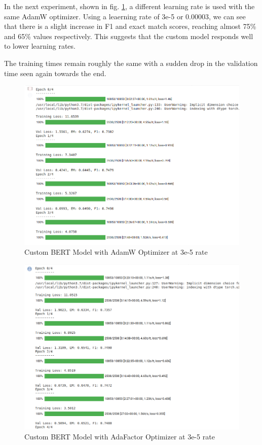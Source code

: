 \documentclass[a4paper,12pt]{report}
\begin{document}
	In the next experiment, shown in fig. \ref{adam3e}, a different learning rate is used with the same AdamW optimizer. Using a leaerning rate of 3e-5 or 0.00003, we can see that there is a slight increase in F1 and exact match scores, reaching almost 75\% and 65\% values respectively. This suggests that the custom model responds well to lower learning rates.
	
	The training times remain roughly the same with a sudden drop in the validation time seen again towards the end. 
	
		\begin{figure}[!h]
			\centering
			\includegraphics[scale=0.35]{../images/AdamW3e.png}
			\caption{Custom BERT Model with AdamW Optimizer at 3e-5 rate}\label{adam3e}
		\end{figure}
		
		\begin{figure}[!h]
			\centering
			\includegraphics[scale=0.35]{../images/AdaFactor3e.png}
			\caption{Custom BERT Model with AdaFactor Optimizer at 3e-5 rate}\label{ada3e}
		\end{figure}
	
\end{document}
